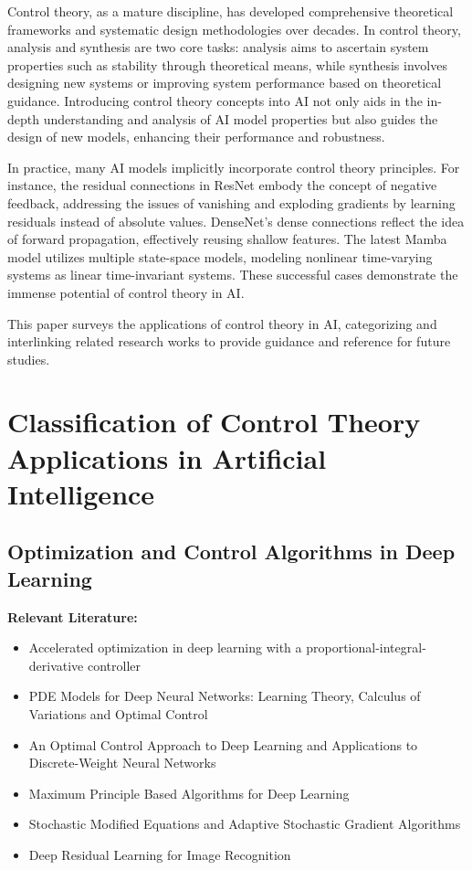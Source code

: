 \documentclass{article}
\theoremstyle{plain}
\theoremstyle{definition}
\theoremstyle{remark}
\begin{document}
Control theory, as a mature discipline, has developed comprehensive theoretical frameworks and systematic design methodologies over decades. In control theory, analysis and synthesis are two core tasks: analysis aims to ascertain system properties such as stability through theoretical means, while synthesis involves designing new systems or improving system performance based on theoretical guidance. Introducing control theory concepts into AI not only aids in the in-depth understanding and analysis of AI model properties but also guides the design of new models, enhancing their performance and robustness.

In practice, many AI models implicitly incorporate control theory principles. For instance, the residual connections in ResNet embody the concept of negative feedback, addressing the issues of vanishing and exploding gradients by learning residuals instead of absolute values. DenseNet's dense connections reflect the idea of forward propagation, effectively reusing shallow features. The latest Mamba model utilizes multiple state-space models, modeling nonlinear time-varying systems as linear time-invariant systems. These successful cases demonstrate the immense potential of control theory in AI.

This paper surveys the applications of control theory in AI, categorizing and interlinking related research works to provide guidance and reference for future studies.

\section{Classification of Control Theory Applications in Artificial Intelligence}

\subsection{Optimization and Control Algorithms in Deep Learning}
\textbf{Relevant Literature:}
\begin{itemize}
    \item Accelerated optimization in deep learning with a proportional-integral-derivative controller
    \item PDE Models for Deep Neural Networks: Learning Theory, Calculus of Variations and Optimal Control
    \item An Optimal Control Approach to Deep Learning and Applications to Discrete-Weight Neural Networks
    \item Maximum Principle Based Algorithms for Deep Learning
    \item Stochastic Modified Equations and Adaptive Stochastic Gradient Algorithms
    \item Deep Residual Learning for Image Recognition
\end{itemize}
\end{document}
